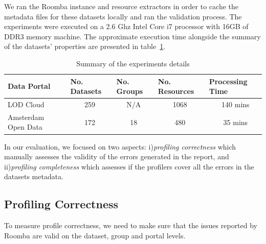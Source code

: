 \documentclass[runningheads,a4paper]{llncs}
\begin{document}
We ran the Roomba instance and resource extractors in order to cache the metadata files for these datasets locally and ran the validation process. The experiments were executed on a 2.6 Ghz Intel Core i7 processor with 16GB of DDR3 memory machine. The approximate execution time alongside the summary of the datasets' properties are presented in table~\ref{tab:data_portals_experiments}.

\begin{table}[ht]
\centering
\begin{tabular}{|l|c|c|c|c|}
\hline
Data Portal         & \multicolumn{1}{l|}{No. Datasets} & \multicolumn{1}{l|}{No. Groups} & \multicolumn{1}{l|}{No. Resources} & \multicolumn{1}{l|}{Processing Time} \\ \hline
LOD Cloud           & 259                               & N/A                            & 1068                               & ~140 mins                            \\ \hline
Amsterdam Open Data & 172                               & 18                             & 480                                & ~35 mins                             \\ \hline
\end{tabular}
\caption{Summary of the experiments details}
\label{tab:data_portals_experiments}
\end{table}

In our evaluation, we focused on two aspects: i)\textit{profiling correctness} which manually assesses the validity of the errors generated in the report, and ii)\textit{profiling completeness} which assesses if the profilers cover all the errors in the datasets metadata.

\subsection{Profiling Correctness}
To measure profile correctness, we need to make sure that the issues reported by Roomba are valid on the dataset, group and portal levels.
\end{document}
